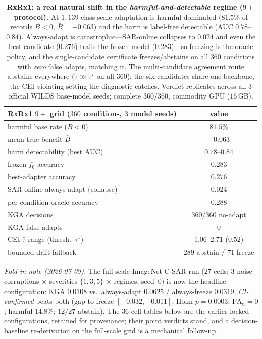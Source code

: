 \documentclass[conference]{IEEEtran}
\theoremstyle{plain}
\theoremstyle{definition}
\begin{document}
\begin{table}[tb]\centering\small
{%
\begin{tabular}{lc}
\toprule
RxRx1 $9{+}$ grid ($360$ conditions, $3$ model seeds) & value \\
\midrule
harmful base rate ($B<0$)             & $81.5\%$ \\
mean true benefit $\bar B$            & $-0.063$ \\
harm detectability (best AUC)         & $0.78$--$0.84$ \\
frozen $f_0$ accuracy                 & $0.283$ \\
best-adapter accuracy                 & $0.276$ \\
SAR-online always-adapt (collapse)    & $0.024$ \\
per-condition oracle accuracy         & $0.288$ \\
\textsc{KGA} decisions                & $360/360$ no-adapt \\
\textsc{KGA} false-adapts             & $0$ \\
CEI $\hat\tau$ range (thresh.\ $\tau^\star$) & $1.06$--$2.71$ ($0.52$) \\
bounded-drift fallback                & $289$ abstain / $71$ freeze \\
\bottomrule
\end{tabular}}
\caption{\textbf{RxRx1: a real natural shift in the \emph{harmful-and-detectable} regime ($9{+}$ protocol).}
At $1{,}139$-class scale adaptation is harmful-dominated ($81.5\%$ of records $B<0$,
$\bar B{=}{-}0.063$) and the harm is label-free detectable (AUC $0.78$--$0.84$). Always-adapt is
catastrophic---SAR-online collapses to $0.024$ and even the best candidate ($0.276$) trails the
frozen model ($0.283$)---so freezing is the oracle policy, and the single-candidate certificate
freezes/abstains on all $360$ conditions with \emph{zero} false adapts, matching it. The
multi-candidate agreement route abstains everywhere ($\hat\tau\gg\tau^\star$ on all $360$): the six
candidates share one backbone, the CEI-violating setting the diagnostic catches. Verdict replicates
across all $3$ official WILDS base-model seeds; complete $360/360$, commodity GPU ($16$\,GB).}
\label{tab:rxrx1}
\end{table}

\noindent\emph{Fold-in note (2026-07-09).} The full-scale ImageNet-C SAR run ($27$ cells; 3 noise
corruptions $\times$ severities $\{1,3,5\}$ $\times$ regimes, seed~0) is now the headline
configuration: \textsc{KGA} $0.0108$ vs.\ always-adapt $0.0625$ / always-freeze $0.0319$,
\emph{CI-confirmed} beats-both (gap to freeze $[-0.032,-0.011]$, Holm $p{=}0.0003$;
$\mathrm{FA}_{\mathrm u}=0$; harmful $14.8\%$; $12/27$ abstain). The $36$-cell tables below are the
earlier locked configurations, retained for provenance; their point verdicts stand, and a
decision-baseline re-derivation on the full-scale grid is a mechanical follow-up.
\end{document}
